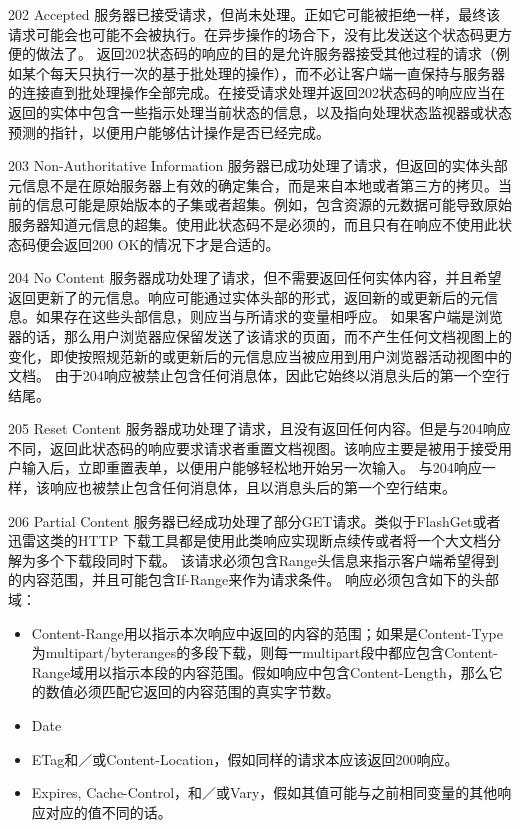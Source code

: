 202 Accepted
服务器已接受请求，但尚未处理。正如它可能被拒绝一样，最终该请求可能会也可能不会被执行。在异步操作的场合下，没有比发送这个状态码更方便的做法了。
返回202状态码的响应的目的是允许服务器接受其他过程的请求（例如某个每天只执行一次的基于批处理的操作），而不必让客户端一直保持与服务器的连接直到批处理操作全部完成。在接受请求处理并返回202状态码的响应应当在返回的实体中包含一些指示处理当前状态的信息，以及指向处理状态监视器或状态预测的指针，以便用户能够估计操作是否已经完成。

203 Non-Authoritative Information
服务器已成功处理了请求，但返回的实体头部元信息不是在原始服务器上有效的确定集合，而是来自本地或者第三方的拷贝。当前的信息可能是原始版本的子集或者超集。例如，包含资源的元数据可能导致原始服务器知道元信息的超集。使用此状态码不是必须的，而且只有在响应不使用此状态码便会返回200 OK的情况下才是合适的。

204 No Content
服务器成功处理了请求，但不需要返回任何实体内容，并且希望返回更新了的元信息。响应可能通过实体头部的形式，返回新的或更新后的元信息。如果存在这些头部信息，则应当与所请求的变量相呼应。
如果客户端是浏览器的话，那么用户浏览器应保留发送了该请求的页面，而不产生任何文档视图上的变化，即使按照规范新的或更新后的元信息应当被应用到用户浏览器活动视图中的文档。
由于204响应被禁止包含任何消息体，因此它始终以消息头后的第一个空行结尾。

205 Reset Content
服务器成功处理了请求，且没有返回任何内容。但是与204响应不同，返回此状态码的响应要求请求者重置文档视图。该响应主要是被用于接受用户输入后，立即重置表单，以便用户能够轻松地开始另一次输入。
与204响应一样，该响应也被禁止包含任何消息体，且以消息头后的第一个空行结束。

206 Partial Content
服务器已经成功处理了部分GET请求。类似于FlashGet或者迅雷这类的HTTP 下载工具都是使用此类响应实现断点续传或者将一个大文档分解为多个下载段同时下载。
该请求必须包含Range头信息来指示客户端希望得到的内容范围，并且可能包含If-Range来作为请求条件。
响应必须包含如下的头部域：

\begin{itemize}
\item Content-Range用以指示本次响应中返回的内容的范围；如果是Content-Type为multipart/byteranges的多段下载，则每一multipart段中都应包含Content-Range域用以指示本段的内容范围。假如响应中包含Content-Length，那么它的数值必须匹配它返回的内容范围的真实字节数。
\item Date
\item ETag和／或Content-Location，假如同样的请求本应该返回200响应。
\item Expires, Cache-Control，和／或Vary，假如其值可能与之前相同变量的其他响应对应的值不同的话。
\end{itemize}


